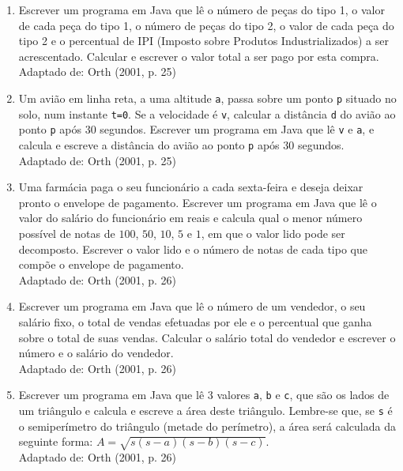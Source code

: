 \documentclass[onecolumn,a4paper,10pt]{report}
\newcommand{\+}{\, + \,}
\newcommand{\<}{\hspace*{-0.4cm}}
\begin{document}
\begin{enumerate}[1.]
\item Escrever um programa em Java que lê o número de peças do tipo 1, o valor de cada peça do tipo 1, o número de peças do tipo 2, o valor de cada peça do tipo 2 e o percentual de IPI (Imposto sobre Produtos Industrializados) a ser acrescentado. Calcular e escrever o valor total a ser pago por esta compra.\\
{\tiny Adaptado de: Orth (2001, p. 25)}

\item Um avião em linha reta, a uma altitude \texttt{a}, passa sobre um ponto \texttt{p} situado no solo, num instante \texttt{t=0}. Se a velocidade é \texttt{v}, calcular a distância \texttt{d} do avião ao ponto \texttt{p} após 30 segundos. Escrever um programa em Java que lê \texttt{v} e \texttt{a}, e calcula e escreve a distância do avião ao ponto \texttt{p} após 30 segundos.\\
{\tiny Adaptado de: Orth (2001, p. 25)}

\item Uma farmácia paga o seu funcionário a cada sexta-feira e deseja deixar pronto o envelope de pagamento. Escrever um programa em Java que lê o valor do salário do funcionário em reais e calcula qual o menor número possível de notas de $100$, $50$, $10$, $5$ e $1$, em que o valor lido pode ser decomposto. Escrever o valor lido e o número de notas de cada tipo que compõe o envelope de pagamento.\\
{\tiny Adaptado de: Orth (2001, p. 26)}

\item Escrever um programa em Java que lê o número de um vendedor, o seu salário fixo, o total de vendas efetuadas por ele e o percentual que ganha sobre o total de suas vendas. Calcular o salário total do vendedor e escrever o número e o salário do vendedor.\\
{\tiny Adaptado de: Orth (2001, p. 26)}

\item Escrever um programa em Java que lê 3 valores \texttt{a}, \texttt{b} e \texttt{c}, que são os lados de um triângulo e calcula e escreve a área deste triângulo. Lembre-se que, se \texttt{s} é o semiperímetro do triângulo (metade do perímetro), a área será calculada da seguinte forma: $A = \sqrt{s(s-a)(s-b)(s-c)}$.\\
{\tiny Adaptado de: Orth (2001, p. 26)}


\end{enumerate}
\end{document}
